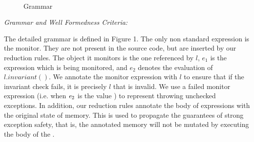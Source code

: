 \begin{figure}
\begin{grammatica}
\\
\\
\\
\\
\\
\\
\end{grammatica}
\caption{Grammar}
\end{figure}


\loseSpace
\noindent\textit{Grammar and Well Formedness Criteria:}

\noindent
The detailed grammar is defined in Figure 1.
The only non standard expression is the monitor. They are not present in the source code, but are inserted by our reduction rules. The object it monitors is the one referenced by $l$, $e_1$ is the expression which is being monitored, and $e_2$ denotes the evaluation of $l.invariant()$.
We annotate the monitor expression with $l$ to ensure
that if the invariant check fails, it is precisely $l$ that is invalid.
We use a failed monitor expression (i.e. when ${\mathit{e}}_2$ is the value \Q@false@) to represent throwing unchecked exceptions.
In addition, our reduction rules annotate the body of \Q@try@ expressions with
the original state of memory. This is used to propagate the guarantees of strong exception safety,
that is, the annotated memory will not be mutated by executing the body of the \Q@try@.

